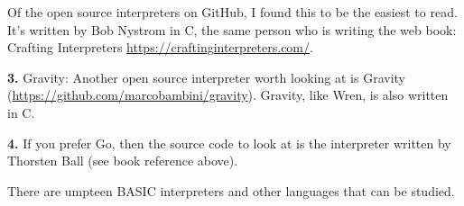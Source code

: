 Of the open source interpreters on GitHub, I found this to be the easiest to read. It's written by Bob Nystrom in C, the same person who is writing the web book: Crafting Interpreters \url{https://craftinginterpreters.com/}.

{\bf 3.} Gravity:  Another open source interpreter worth looking at is Gravity (\url{https://github.com/marcobambini/gravity}). Gravity, like Wren, is also written in C.

{\bf 4.}  If you prefer Go, then the source code to look at is the interpreter written by Thorsten Ball (see book reference above).

There are umpteen BASIC interpreters and other languages that can be studied.

\bigskip\medskip

\begin{center}
\end{center} 